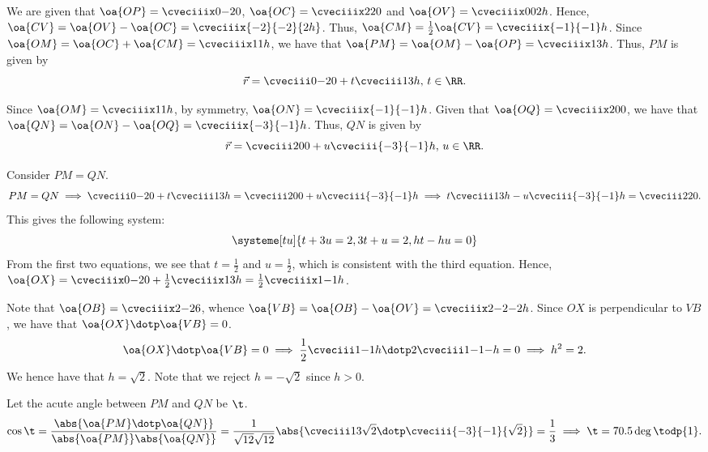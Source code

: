 \begin{solution}
    We are given that $\oa{OP} = \cveciiix0{-2}0$, $\oa{OC} = \cveciiix220$ and $\oa{OV} = \cveciiix00{2h}$. Hence, $\oa{CV} = \oa{OV} - \oa{OC} = \cveciiix{-2}{-2}{2h}$. Thus, $\oa{CM} = \frac12 \oa{CV} = \cveciiix{-1}{-1}h$. Since $\oa{OM} = \oa{OC} + \oa{CM} = \cveciiix11h$, we have that $\oa{PM} = \oa{OM} - \oa{OP} = \cveciiix13h$. Thus, $PM$ is given by \[\vec r = \cveciii0{-2}0 + t\cveciii13h, \, t \in \RR.\]

    \begin{ppart}
        Since $\oa{OM} = \cveciiix11h$, by symmetry, $\oa{ON} = \cveciiix{-1}{-1}h$. Given that $\oa{OQ} = \cveciiix200$, we have that $\oa{QN} = \oa{ON} - \oa{OQ} = \cveciiix{-3}{-1}h$. Thus, $QN$ is given by \[\vec r = \cveciii200 + u\cveciii{-3}{-1}h, \, u \in \RR.\]
    \end{ppart}
    \begin{ppart}
        Consider $PM = QN$. \[PM = QN \implies \cveciii0{-2}0 + t\cveciii13h = \cveciii200 + u\cveciii{-3}{-1}h \implies t\cveciii13h - u\cveciii{-3}{-1}h = \cveciii220.\] This gives the following system: \[
            \systeme[tu]{
                t + 3u = 2,
                3t + u = 2,
                ht - hu = 0
            }
        \] From the first two equations, we see that $t = \frac12$ and $u = \frac12$, which is consistent with the third equation. Hence, $\oa{OX} = \cveciiix0{-2}0 + \frac12 \cveciiix13h = \frac12 \cveciiix1{-1}h$.
    \end{ppart}
    \begin{ppart}
        Note that $\oa{OB} = \cveciiix2{-2}6$, whence $\oa{VB} = \oa{OB} - \oa{OV} = \cveciiix2{-2}{-2h}$. Since $OX$ is perpendicular to $VB$, we have that $\oa{OX} \dotp \oa{VB} = 0$. \[\oa{OX} \dotp \oa{VB} = 0 \implies \frac12 \cveciii1{-1}h \dotp 2 \cveciii1{-1}{-h} = 0 \implies h^2 = 2.\] We hence have that $h = \sqrt2$. Note that we reject $h = -\sqrt2$ since $h > 0$.

        Let the acute angle between $PM$ and $QN$ be $\t$. \[\cos\t = \frac{\abs{\oa{PM} \dotp \oa{QN}}}{\abs{\oa{PM}}\abs{\oa{QN}}} = \frac1{\sqrt{12}\sqrt{12}} \abs{\cveciii13{\sqrt2} \dotp \cveciii{-3}{-1}{\sqrt2}} = \frac13 \implies \t = 70.5\deg \todp{1}.\]
    \end{ppart}
\end{solution}